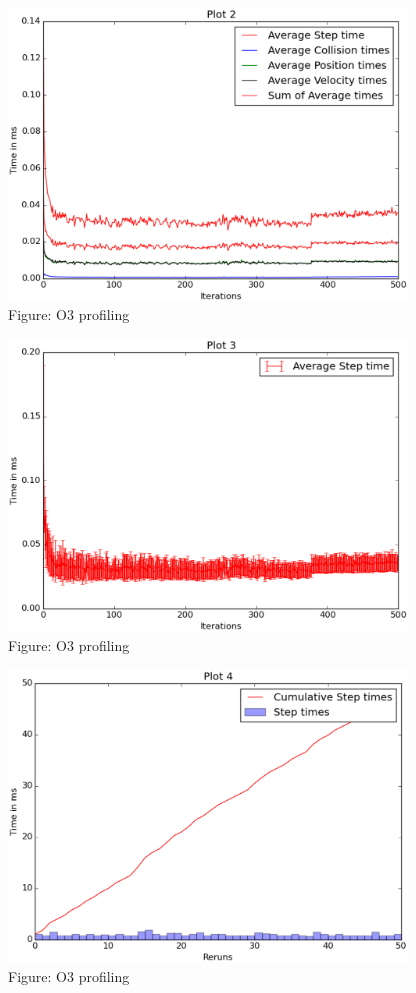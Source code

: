 \documentclass[english, 11pt]{article}
\begin{document}
\begin{figure}
	\begin{center}
		\includegraphics[width=400px]{g02_lab09_plot02}
	\end{center}
	\caption{Figure: O3 profiling}
\end{figure}

\begin{figure}
	\begin{center}
		\includegraphics[width=400px]{g02_lab09_plot03}
	\end{center}
	\caption{Figure: O3 profiling}
\end{figure}

\begin{figure}
	\begin{center}
		\includegraphics[width=400px]{g02_lab09_plot04}
	\end{center}
	\caption{Figure: O3 profiling}
\end{figure}
\end{document}
